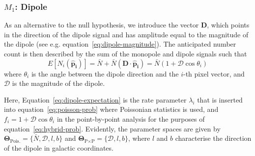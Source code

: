 \documentclass[fleqn,usenatbib]{mnras}
\begin{document}

    \subsubsection{$M_1$: Dipole}
        As an alternative to the null hypothesis, we introduce the vector $\mathbf{D}$, which points in the direction of the dipole signal and has amplitude equal to the magnitude of the dipole (see e.g. equation~\eqref{eq:dipole-magnitude}). 
        The anticipated number count is then described by the sum of the monopole and dipole signals \citep[see e.g.][]{dam2023} such that
        \begin{equation}
            E [N_i (\mathbf{\hat{p}_i}) ] = \bar{N} + \bar{N} (\mathbf{D} \cdot \mathbf{\hat{p}_i}) = \bar{N}(1 + \mathcal{D} \cos \theta_i) \label{eq:dipole-expectation}
        \end{equation}
        where $\theta_i$ is the angle between the dipole direction and the $i$-th pixel vector, and $\mathcal{D}$ is the magnitude of the dipole.
        
        Here, Equation~\eqref{eq:dipole-expectation} is the rate parameter $\lambda_i$ that is inserted into equation~\eqref{eq:poisson-prob} where Poissonian statistics is used, and $f_i = 1 + \mathcal{D} \cos \theta_i$ in the point-by-point analysis for the purposes of equation~\eqref{eq:hybrid-prob}.
        Evidently, the parameter spaces are given by $\mathbf{\Theta}_{\text{Pois.}} = \{ \bar{N}, \mathcal{D}, l, b \}$ and $\mathbf{\Theta}_{\text{P}\times\text{P}} = \{ \mathcal{D}, l, b \}$, where $l$ and $b$ characterise the direction of the dipole in galactic coordinates.
        
        
\end{document}
